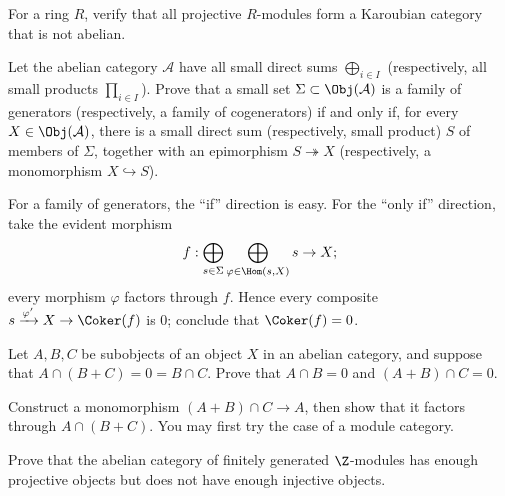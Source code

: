 \begin{Exercises}
	\item For a ring $R$, verify that all projective $R$-modules form a
	Karoubian category that is not abelian.

	\item Let the abelian category $\mathcal{A}$ have all small direct sums
	$\bigoplus_{i\in I}$ (respectively, all small products
	$\prod_{i\in I}$). Prove that a small set
	$\Sigma\subset\Obj(\mathcal{A})$ is a family of generators (respectively,
	a family of cogenerators) if and only if, for every
	$X\in\Obj(\mathcal{A})$, there is a small direct sum (respectively, small
	product) $S$ of members of $\Sigma$, together with an epimorphism
	$S\twoheadrightarrow X$ (respectively, a monomorphism $X\hookrightarrow S$).

	\begin{hint}
		For a family of generators, the ``if'' direction is easy. For the
		``only if'' direction, take the evident morphism
		\[ f: \bigoplus_{s \in \Sigma} \bigoplus_{\varphi \in \Hom(s, X)} s \to X; \]
		every morphism $\varphi$ factors through $f$. Hence every composite
		$s\xrightarrow{\varphi'}X\to\Coker(f)$ is $0$; conclude that
		$\Coker(f)=0$.
	\end{hint}

	\item Let $A,B,C$ be subobjects of an object $X$ in an abelian category,
	and suppose that $A\cap(B+C)=0=B\cap C$. Prove that $A\cap B=0$ and
	$(A+B)\cap C=0$.

	\begin{hint}
		Construct a monomorphism $(A+B)\cap C\to A$, then show that it factors
		through $A\cap(B+C)$. You may first try the case of a module category.
	\end{hint}

	\item Prove that the abelian category of finitely generated $\Z$-modules
	has enough projective objects but does not have enough injective objects.


\end{Exercises}
